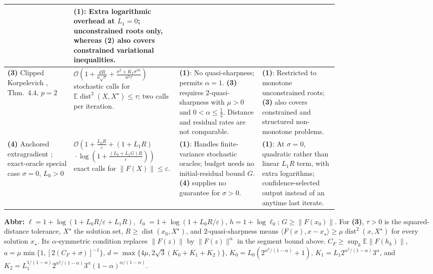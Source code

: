 \begin{table}[tp]
\begin{threeparttable}
\begin{tabularx}{\linewidth}{@{}>{\raggedright\arraybackslash}p{0.20\linewidth}>{\raggedright\arraybackslash}p{0.32\linewidth}>{\raggedright\arraybackslash}p{0.25\linewidth}>{\raggedright\arraybackslash}X@{}}
& \textbf{(1)}: Extra logarithmic overhead at $L_1=0$; unconstrained roots only, whereas \textbf{(2)} also covers constrained variational inequalities. \\
\midrule
\textbf{(3)} Clipped Korpelevich \citep{sgmVankov2025v2}, Thm.~4.4, $p=2$
& $\mathcal{O}\!\left(1+\frac{dR}{a\sqrt{\tau}}+\frac{\sigma^2+K_1\sigma^{2\alpha}}{a^2\tau}\right)$ stochastic calls for $\mathbb{E}\operatorname{dist}^2(X,X^\star)\le\tau$; two calls per iteration.
& \textbf{(1)}: No quasi-sharpness; permits $\alpha=1$. \textbf{(3)} requires $2$-quasi-sharpness with $\mu>0$ and $0<\alpha\le\tfrac12$. Distance and residual rates are not comparable.
& \textbf{(1)}: Restricted to monotone unconstrained roots; \textbf{(3)} also covers constrained and structured non-monotone problems. \\
\midrule
\textbf{(4)} Anchored extragradient \citep{cgmRepositoryAnchored}; exact-oracle special case $\sigma=0$, $L_0>0$
& $\mathcal{O}\!\left(1+\frac{L_0R}{\varepsilon}+(1+L_1R)\right.$\newline
$\left.{}\cdot\log\!\left(1+\frac{(L_0+L_1G)R}{\varepsilon}\right)\right)$ exact calls for $\|F(X)\|\le\varepsilon$.
& \textbf{(1)}: Handles finite-variance stochastic oracles; budget needs no initial-residual bound $G$. \textbf{(4)} supplies no guarantee for $\sigma>0$.
& \textbf{(1)}: At $\sigma=0$, quadratic rather than linear $L_1R$ term, with extra logarithms; confidence-selected output instead of an anytime last iterate. \\
\bottomrule
\end{tabularx}
\begin{tablenotes}[flushleft]\footnotesize
\item[] \textbf{Abbr:} $\ell=1+\log(1+L_0R/\varepsilon+L_1R)$, $\ell_0=1+\log(1+L_0R/\varepsilon)$, $h=1+\log\ell_0$; $G\ge\|F(x_0)\|$.
For \textbf{(3)}, $\tau>0$ is the squared-distance tolerance, $X^\star$ the solution set, $R\ge\operatorname{dist}(x_0,X^\star)$, and $2$-quasi-sharpness means $\langle F(x),x-x_\star\rangle\ge\mu\operatorname{dist}^2(x,X^\star)$ for every solution $x_\star$.
Its $\alpha$-symmetric condition replaces $\|F(z)\|$ by $\|F(z)\|^\alpha$ in the segment bound above.
$C_F\ge\sup_k\mathbb{E}\|F(h_k)\|$, $a=\mu\min\{1,[2(C_F+\sigma)]^{-1}\}$, $d=\max\{4\mu,2\sqrt3(K_0+K_1+K_2)\}$,
$K_0=L_0(2^{\alpha^2/(1-\alpha)}+1)$, $K_1=L_1 2^{\alpha^2/(1-\alpha)}3^\alpha$, and $K_2=L_1^{1/(1-\alpha)}2^{\alpha^2/(1-\alpha)}3^\alpha(1-\alpha)^{\alpha/(1-\alpha)}$.
\end{tablenotes}
\end{threeparttable}
\end{table}
\clearpage
